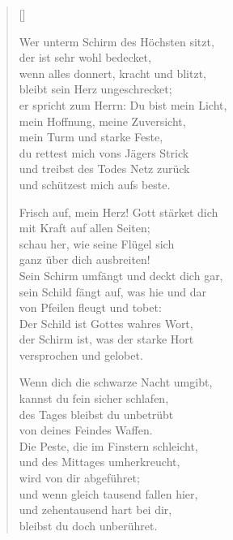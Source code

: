\begin{multicols}{2}
\settowidth{\versewidth}{Frisch auf, mein Herz! Gott stärket dich}
\begin{verse}[\versewidth]

 Wer unterm Schirm des Höchsten sitzt,\\
der ist sehr wohl bedecket,\\
wenn alles donnert, kracht und blitzt,\\
bleibt sein Herz ungeschrecket;\\
er spricht zum Herrn: Du bist mein Licht,\\
mein Hoffnung, meine Zuversicht,\\
mein Turm und starke Feste,\\
du rettest mich vons Jägers Strick\\
und treibst des Todes Netz zurück\\
und schützest mich aufs beste.

 Frisch auf, mein Herz! Gott stärket dich\\
mit Kraft auf allen Seiten;\\
schau her, wie seine Flügel sich\\
ganz über dich ausbreiten!\\
Sein Schirm umfängt und deckt dich gar,\\
sein Schild fängt auf, was hie und dar\\
von Pfeilen fleugt und tobet:\\
Der Schild ist Gottes wahres Wort,\\
der Schirm ist, was der starke Hort\\
versprochen und gelobet.

 Wenn dich die schwarze Nacht umgibt,\\
kannst du fein sicher schlafen,\\
des Tages bleibst du unbetrübt\\
von deines Feindes Waffen.\\
Die Peste, die im Finstern schleicht,\\
und des Mittages umherkreucht,\\
wird von dir abgeführet;\\
und wenn gleich tausend fallen hier,\\
und zehentausend hart bei dir,\\
bleibst du doch unberühret.


\end{verse}
\end{multicols}

